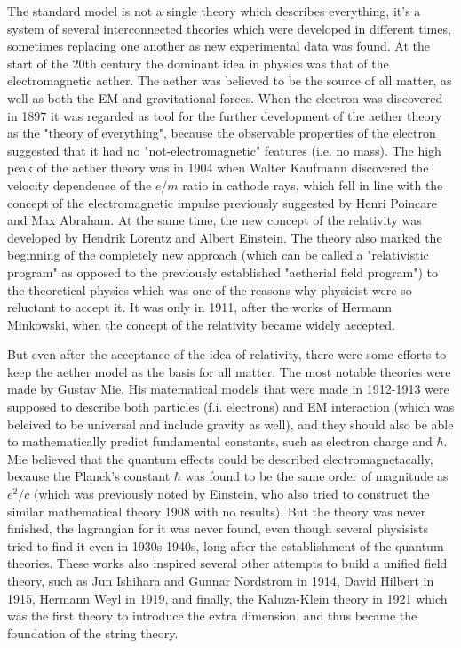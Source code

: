 The standard model is not a single theory which describes everything, it's a system of several interconnected theories which were developed in different times, sometimes replacing one another as new experimental data was found. At the start of the 20th century the dominant idea in physics was that of the electromagnetic aether. The aether was believed to be the source of all matter, as well as both the EM and gravitational forces. When the electron was discovered in 1897 it was regarded as tool for the further development of the aether theory as the "theory of everything", because the observable properties of the electron suggested that it had no "not-electromagnetic" features (i.e. no mass). The high peak of the aether theory was in 1904 when Walter Kaufmann discovered the velocity dependence of the $e/m$ ratio in cathode rays, which fell in line with the concept of the electromagnetic impulse previously suggested by Henri Poincare and Max Abraham. At the same time, the new concept of the relativity was developed by Hendrik Lorentz and Albert Einstein. The theory also marked the beginning of the completely new approach (which can be called a "relativistic program" as opposed to the previously established "aetherial field program") to the theoretical physics which was one of the reasons why physicist were so reluctant to accept it. It was only in 1911, after the works of Hermann Minkowski, when the concept of the relativity became widely accepted.

But even after the acceptance of the idea of relativity, there were some efforts to keep the aether model as the basis for all matter. The most notable theories were made by Gustav Mie. His matematical models that were made in 1912-1913 were supposed to describe both particles (f.i. electrons) and EM interaction (which was beleived to be universal and include gravity as well), and they should also be able to mathematically predict fundamental constants, such as electron charge and $\hbar$. Mie believed that the quantum effects could be described electromagnetacally, because the Planck's constant $\hbar$ was found to be the same order of magnitude as $e^{2}/c$ (which was previously noted by Einstein, who also tried to construct the similar mathematical theory 1908 with no results). But the theory was never finished, the lagrangian for it was never found, even though several physisists tried to find it even in 1930s-1940s, long after the establishment of the quantum theories. These works also inspired several other attempts to build a unified field theory, such as Jun Ishihara and Gunnar Nordstrom in 1914, David Hilbert in 1915, Hermann Weyl in 1919, and finally, the Kaluza-Klein theory in 1921 which was the first theory to introduce the extra dimension, and thus became the foundation of the string theory.

